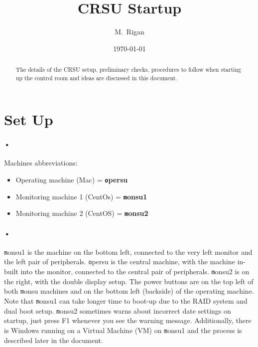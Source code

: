 \documentclass[12pt, oneside, a4paper]{article}
\title{CRSU Startup}
\author{M.\ Rigan}
\affil{MPS, University of Sussex}
\date{\today}
\begin{document}
\maketitle
\begin{abstract}
		The details of the CRSU setup, preliminary checks, procedures to follow when starting up the control room and ideas are discussed in this document.
\end{abstract}
\clearpage
\tableofcontents
\clearpage

\section{Set Up}
\paragraph{•}
Machines abbreviations:
\begin{itemize}
	\item Operating machine (Mac) = \textbf{\texttt opersu}
	\item Monitoring machine 1 (CentOs) = \textbf{\texttt monsu1 }
	\item Monitoring machine 2 (CentOS) = \textbf{\texttt monsu2}
\end{itemize}
\begin{center}
\end{center}
\paragraph{•}
{\texttt monsu1} is the machine on the bottom left, connected to the very left monitor and the left pair of peripherals. {\texttt opersu} is the central machine, with the machine in-built into the monitor, connected to the central pair of peripherals. {\texttt monsu2} is on the right, with the double display setup. The power buttons are on the top left of both {\texttt monsu} machines and on the bottom left (backside) of the operating machine. Note that {\texttt monsu1} can take longer time to boot-up due to the RAID system and dual boot setup. {\texttt monsu2 }sometimes warns about incorrect date settings on startup, just press F1 whenever you see the warning message. Additionally, there is Windows running on a Virtual Machine (VM) on {\texttt monsu1} and the process is described later in the document.
\end{document}
